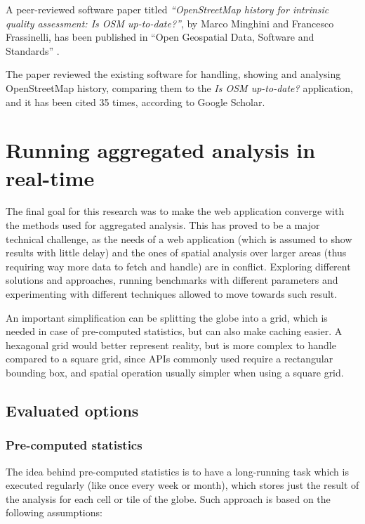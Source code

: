 \documentclass{Configuration_Files/PoliMi3i_thesis}
\begin{document}
A peer-reviewed software paper titled \textit{“OpenStreetMap history for intrinsic quality assessment: Is OSM up-to-date?”}, by Marco Minghini and Francesco Frassinelli, has been published in “Open Geospatial Data, Software and Standards” \cite{minghiniOpenStreetMapHistoryIntrinsic2019}.

The paper reviewed the existing software for handling, showing and analysing OpenStreetMap history, comparing them to the \textit{Is OSM up-to-date?} application, and it has been cited 35 times, according to Google Scholar.

\section{Running aggregated analysis in real-time}

The final goal for this research was to make the web application converge with the methods used for aggregated analysis. This has proved to be a major technical challenge, as the needs of a web application (which is assumed to show results with little delay) and the ones of spatial analysis over larger areas (thus requiring way more data to fetch and handle) are in conflict.
Exploring different solutions and approaches, running benchmarks with different parameters and experimenting with different techniques allowed to move towards such result.

An important simplification can be splitting the globe into a grid, which is needed in case of pre-computed statistics, but can also make caching easier. A hexagonal grid would better represent reality, but is more complex to handle compared to a square grid, since APIs commonly used require a rectangular bounding box, and spatial operation usually simpler when using a square grid. 

\subsection{Evaluated options}

\subsubsection{Pre-computed statistics}

The idea behind pre-computed statistics is to have a long-running task which is executed regularly (like once every week or month), which stores just the result of the analysis for each cell or tile of the globe. Such approach is based on the following assumptions:
\end{document}
